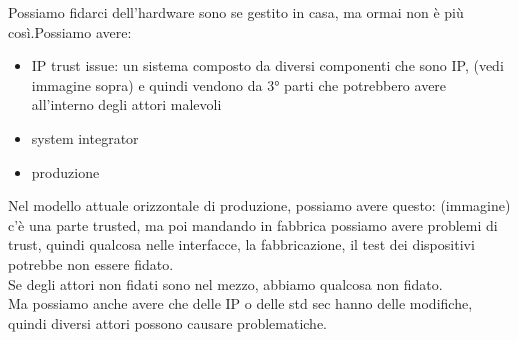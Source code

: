 \documentclass[oneside, 12pt]{extbook}
\begin{document}
Possiamo fidarci dell'hardware sono se gestito in casa, ma ormai non è più così.Possiamo avere:
\begin{itemize}
	\item IP trust issue: un sistema composto da diversi componenti che sono IP, (vedi immagine sopra) e quindi vendono da 3° parti che potrebbero avere all'interno degli attori malevoli
	\item system integrator
	\item produzione
\end{itemize}
Nel modello attuale orizzontale di produzione, possiamo avere questo: (immagine)\\c'è una parte trusted, ma poi mandando in fabbrica possiamo avere problemi di trust, quindi qualcosa nelle interfacce, la fabbricazione, il test dei dispositivi potrebbe non essere fidato.\\Se degli attori non fidati sono nel mezzo, abbiamo qualcosa non fidato.\\Ma possiamo anche avere che delle IP o delle std sec hanno delle modifiche, quindi diversi attori possono causare problematiche.
\end{document}

